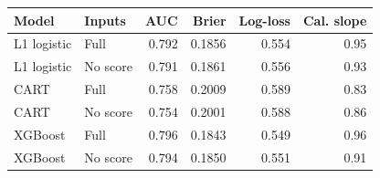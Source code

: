 \begin{tabular}{@{}llrrrr@{}}
\toprule
Model & Inputs & AUC & Brier & Log-loss & Cal. slope \\
\midrule
L1 logistic & Full & 0.792 & 0.1856 & 0.554 & 0.95 \\
L1 logistic & No score & 0.791 & 0.1861 & 0.556 & 0.93 \\
CART & Full & 0.758 & 0.2009 & 0.589 & 0.83 \\
CART & No score & 0.754 & 0.2001 & 0.588 & 0.86 \\
XGBoost & Full & 0.796 & 0.1843 & 0.549 & 0.96 \\
XGBoost & No score & 0.794 & 0.1850 & 0.551 & 0.91 \\
\bottomrule
\end{tabular}
